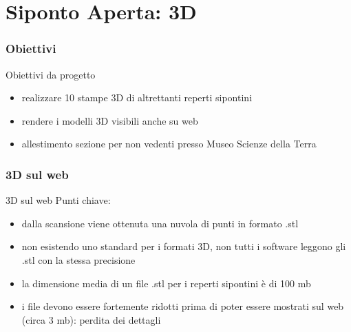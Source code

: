 \documentclass{beamer}
\begin{document}
\part{Siponto Aperta: 3D}
\frame{\partpage}

	\section{Obiettivi}
		\begin{frame}{Obiettivi da progetto}
			\begin{itemize}
				\item realizzare 10 stampe 3D di altrettanti reperti sipontini
				\item rendere i modelli 3D visibili anche su web
				\item allestimento sezione per non vedenti presso Museo Scienze della Terra
			\end{itemize}
		\end{frame}
	
	\section{3D sul web}

		\begin{frame}{3D sul web}
			Punti chiave:
			\begin{itemize}
				\item dalla scansione viene ottenuta una nuvola di punti in formato .stl
				\item non esistendo uno standard per i formati 3D, non tutti i software leggono gli .stl con la stessa precisione
				\item la dimensione media di un file .stl per i reperti sipontini è di 100 mb
				\item i file devono essere fortemente ridotti prima di poter essere mostrati sul web (circa 3 mb): perdita dei dettagli
			\end{itemize}
		\end{frame}
\end{document}
